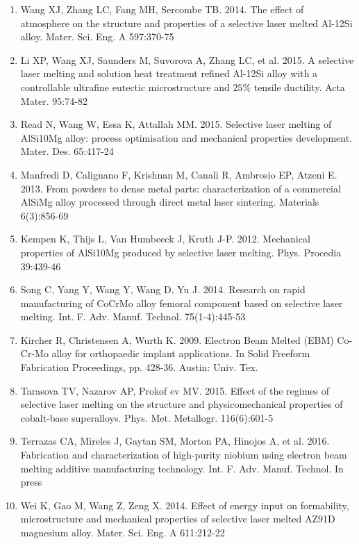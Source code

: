 \documentclass[10pt]{article}
\begin{document}
\begin{enumerate}
  \item Wang XJ, Zhang LC, Fang MH, Sercombe TB. 2014. The effect of atmosphere on the structure and properties of a selective laser melted Al-12Si alloy. Mater. Sci. Eng. A 597:370-75

  \item Li XP, Wang XJ, Saunders M, Suvorova A, Zhang LC, et al. 2015. A selective laser melting and solution heat treatment refined Al-12Si alloy with a controllable ultrafine eutectic microstructure and $25 \%$ tensile ductility. Acta Mater. 95:74-82

  \item Read N, Wang W, Essa K, Attallah MM. 2015. Selective laser melting of AlSi10Mg alloy: process optimisation and mechanical properties development. Mater. Des. 65:417-24

  \item Manfredi D, Calignano F, Krishnan M, Canali R, Ambrosio EP, Atzeni E. 2013. From powders to dense metal parts: characterization of a commercial AlSiMg alloy processed through direct metal laser sintering. Materials 6(3):856-69

  \item Kempen K, Thijs L, Van Humbeeck J, Kruth J-P. 2012. Mechanical properties of AlSi10Mg produced by selective laser melting. Phys. Procedia 39:439-46

  \item Song C, Yang Y, Wang Y, Wang D, Yu J. 2014. Research on rapid manufacturing of CoCrMo alloy femoral component based on selective laser melting. Int. F. Adv. Manuf. Technol. 75(1-4):445-53

  \item Kircher R, Christensen A, Wurth K. 2009. Electron Beam Melted (EBM) Co-Cr-Mo alloy for orthopaedic implant applications. In Solid Freeform Fabrication Proceedings, pp. 428-36. Austin: Univ. Tex.

  \item Tarasova TV, Nazarov AP, Prokof ev MV. 2015. Effect of the regimes of selective laser melting on the structure and physicomechanical properties of cobalt-base superalloys. Phys. Met. Metallogr. 116(6):601-5

  \item Terrazas CA, Mireles J, Gaytan SM, Morton PA, Hinojos A, et al. 2016. Fabrication and characterization of high-purity niobium using electron beam melting additive manufacturing technology. Int. F. Adv. Manuf. Technol. In press

  \item Wei K, Gao M, Wang Z, Zeng X. 2014. Effect of energy input on formability, microstructure and mechanical properties of selective laser melted AZ91D magnesium alloy. Mater. Sci. Eng. A 611:212-22


\end{enumerate}
\end{document}
